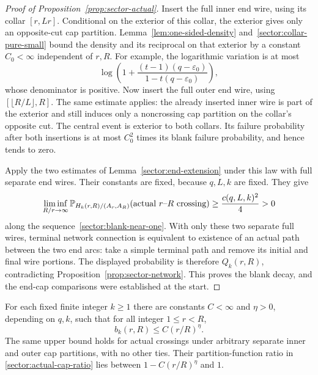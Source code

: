 \begin{proof}[Proof of Proposition~\ref{prop:sector-actual}]
Insert the full inner end wire, using its collar $[r,Lr]$.
Conditional on the exterior of this collar, the exterior gives
only an opposite-cut cap partition.  Lemma~\ref{lem:one-sided-density}
and~\eqref{sector:collar-pure-small} bound the density and its
reciprocal on that exterior by a constant $C_0<\infty$ independent
of $r,R$.  For example, the logarithmic variation is at most
\[
 \log\left(1+\frac{(t-1)(q-\varepsilon_0)}
                         {1-t(q-\varepsilon_0)}\right),
\]
whose denominator is positive.  Now insert the full outer end wire,
using $[\lfloor R/L\rfloor,R]$.  The same estimate applies:
the already inserted inner wire is part of the exterior and still
induces only a noncrossing cap partition on the collar's opposite
cut.  The central event is exterior to both collars.  Its failure
probability after both insertions is at most $C_0^2$ times its
blank failure probability, and hence tends to zero.

Apply the two estimates of Lemma~\ref{sector:end-extension} under
this law with full separate end wires.  Their constants are fixed,
because $q,L,k$ are fixed.  They give
\[
 \liminf_{R/r\to\infty}
 \mathbb P_{H_k(r,R)/(A_r,A_R)}
       (\text{actual $r$--$R$ crossing})
 \ge \frac{c(q,L,k)^2}{4}>0
\]
along the sequence~\eqref{sector:blank-near-one}.  With only these
two separate full wires, terminal network connection is equivalent
to existence of an actual path between the two end arcs: take a
simple terminal path and remove its initial and final wire portions.
The displayed probability is therefore $Q_k(r,R)$, contradicting
Proposition~\ref{prop:sector-network}.  This proves the blank decay,
and the end-cap comparisons were established at the start.
\end{proof}

\begin{corollary}
\label{cor:sector:power}
For each fixed finite integer $k\ge1$ there are constants $C<\infty$
and $\eta>0$, depending on $q,k$, such that for all integer
$1\le r<R$,
\begin{equation}
\label{sector:power-arm}
 b_k(r,R)\le C(r/R)^\eta.
\end{equation}
The same upper bound holds for actual crossings under arbitrary
separate inner and outer cap partitions, with no other ties.
Their partition-function ratio in
\eqref{sector:actual-cap-ratio} lies between
$1-C(r/R)^\eta$ and $1$.
\end{corollary}

